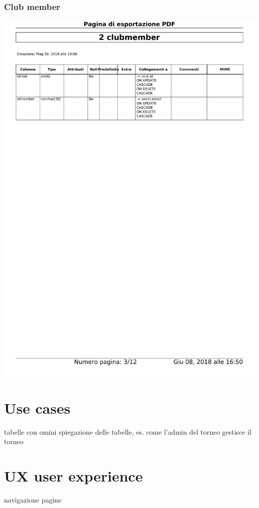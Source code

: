 \documentclass{article}
\begin{document}
    \subsubsection{Club member}
    \begin{center}
        \includegraphics[width=15cm]{images/clubmember}
    \end{center}

    \section{Use cases}
    tabelle con omini
    spiegazione delle tabelle, es. come l'admin del torneo gestisce il torneo

    \section{UX user experience}
    navigazione pagine 
   
\end{document}
